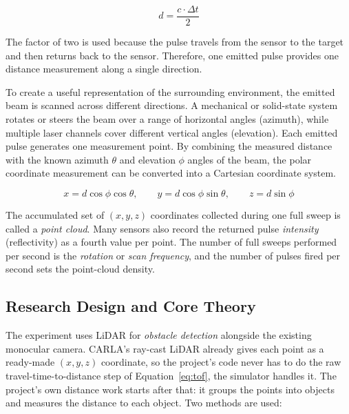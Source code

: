 \documentclass[12pt, a4paper]{report}
\begin{document}
\begin{equation}
d = \frac{c \cdot \Delta t}{2}
\label{eq:tof}
\end{equation}

The factor of two is used because the pulse travels from the sensor to the target and 
then returns back to the sensor. Therefore, one emitted pulse provides one distance 
measurement along a single direction.

To create a useful representation of the surrounding environment, the emitted beam is 
scanned across different directions. A mechanical or solid-state system rotates or steers 
the beam over a range of horizontal angles (azimuth), while multiple laser channels cover 
different vertical angles (elevation). Each emitted pulse generates one measurement point. 
By combining the measured distance with the known azimuth $\theta$ and elevation $\phi$ 
angles of the beam, the polar coordinate measurement can be converted into a Cartesian 
coordinate system.

\begin{equation}
x = d\cos\phi\cos\theta, \qquad
y = d\cos\phi\sin\theta, \qquad
z = d\sin\phi
\label{eq:polar}
\end{equation}

The accumulated set of $(x, y, z)$ coordinates collected during one full sweep
is called a \emph{point cloud}. Many sensors also record the returned pulse
\emph{intensity} (reflectivity) as a fourth value per point. The number of full
sweeps performed per second is the \emph{rotation} or \emph{scan frequency}, and
the number of pulses fired per second sets the point-cloud density.

\subsection{Research Design and Core Theory}

The experiment uses LiDAR for \emph{obstacle detection} alongside the existing
monocular camera. CARLA's ray-cast LiDAR already gives each point as a ready-made
$(x, y, z)$ coordinate, so the project's code never has to do the raw
travel-time-to-distance step of Equation~\ref{eq:tof}, the simulator handles
it. The project's own distance work starts after that: it groups the points into
objects and measures the distance to each object. Two methods are used:
\end{document}
